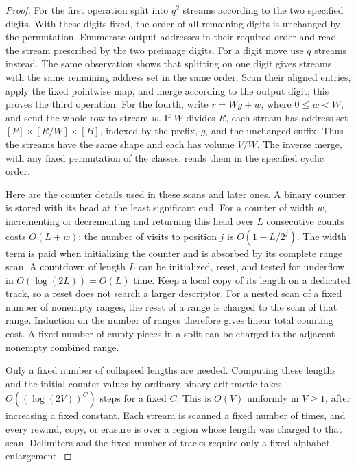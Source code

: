 \begin{proof}
For the first operation split into $q^2$ streams according to the two
specified digits.  With these digits fixed, the order of all remaining
digits is unchanged by the permutation.  Enumerate output addresses in
their required order and read the stream prescribed by the two preimage
digits.  For a digit move use $q$ streams instead.  The same observation
shows that splitting on one digit gives streams with the same remaining
address set in the same order.  Scan their aligned entries, apply the
fixed pointwise map, and merge according to the output digit; this proves
the third operation.  For the fourth, write $r=Wg+w$, where
$0\le w<W$, and send the whole row to stream $w$.  If $W$ divides $R$,
each stream has address set $[P]\times[R/W]\times[B]$, indexed by the
prefix, $g$, and the unchanged suffix.  Thus the streams have the same
shape and each has volume $V/W$.  The inverse merge, with any fixed
permutation of the classes, reads them in the specified cyclic order.

Here are the counter details used in these scans and later ones.  A
binary counter is stored with its head at the least significant end.
For a counter of width $w$, incrementing or decrementing and returning
this head over $L$ consecutive counts costs $O(L+w)$: the number of
visits to position $j$ is $O(1+L/2^j)$. The width term is paid when
initializing the counter and is absorbed by its complete range scan.  A countdown of
length $L$ can be initialized, reset, and tested for underflow in
$O(\log(2L))=O(L)$ time.  Keep a local copy of its length on a dedicated
track, so a reset does not search a larger descriptor.  For a nested scan
of a fixed number of nonempty ranges, the reset of a range is charged to
the scan of that range.  Induction on the number of ranges therefore gives
linear total counting cost.  A fixed number of empty pieces in a split
can be charged to the adjacent nonempty combined range.

Only a fixed number of collapsed lengths are needed.  Computing these
lengths and the initial counter values by ordinary binary arithmetic
takes $O((\log(2V))^C)$ steps for a fixed $C$.  This is $O(V)$ uniformly
in $V\ge1$, after increasing a fixed constant.  Each stream is scanned a
fixed number of times, and every rewind, copy, or erasure is over a
region whose length was charged to that scan.  Delimiters and the fixed
number of tracks require only a fixed alphabet enlargement.
\end{proof}

